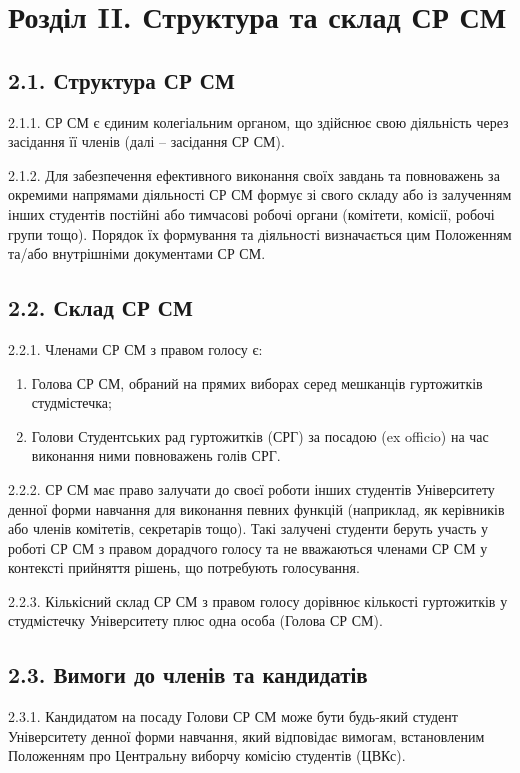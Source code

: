 \section*{Розділ II. Структура та склад СР СМ}

\subsection*{2.1. Структура СР СМ}
    2.1.1. СР СМ є єдиним колегіальним органом, що здійснює свою діяльність через засідання її членів (далі – засідання СР СМ).

    2.1.2. Для забезпечення ефективного виконання своїх завдань та повноважень за окремими напрямами діяльності СР СМ формує зі свого складу або із залученням інших студентів постійні або тимчасові робочі органи (комітети, комісії, робочі групи тощо). Порядок їх формування та діяльності визначається цим Положенням та/або внутрішніми документами СР СМ.

\subsection*{2.2. Склад СР СМ}
    2.2.1. Членами СР СМ з правом голосу є:

        \begin{enumerate}[label=\alph*)]
            \item Голова СР СМ, обраний на прямих виборах серед мешканців гуртожитків студмістечка;
            \item Голови Студентських рад гуртожитків (СРГ) за посадою (ex officio) на час виконання ними повноважень голів СРГ.
        \end{enumerate}

    2.2.2. СР СМ має право залучати до своєї роботи інших студентів Університету денної форми навчання для виконання певних функцій (наприклад, як керівників або членів комітетів, секретарів тощо). Такі залучені студенти беруть участь у роботі СР СМ з правом дорадчого голосу та не вважаються членами СР СМ у контексті прийняття рішень, що потребують голосування.

    2.2.3. Кількісний склад СР СМ з правом голосу дорівнює кількості гуртожитків у студмістечку Університету плюс одна особа (Голова СР СМ).

\subsection*{2.3. Вимоги до членів та кандидатів}
    2.3.1. Кандидатом на посаду Голови СР СМ може бути будь-який студент Університету денної форми навчання, який відповідає вимогам, встановленим Положенням про Центральну виборчу комісію студентів (ЦВКс).

